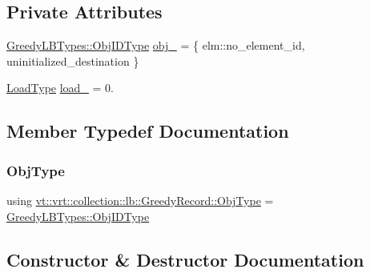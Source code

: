 \subsection*{Private Attributes}
\begin{DoxyCompactItemize}
\item 
\hyperlink{structvt_1_1vrt_1_1collection_1_1lb_1_1_greedy_l_b_types_ae22670acd689e4ff83315fac2e4acb5e}{Greedy\+L\+B\+Types\+::\+Obj\+I\+D\+Type} \hyperlink{structvt_1_1vrt_1_1collection_1_1lb_1_1_greedy_record_ab0e01d4431f547a017c9a4887bf5d207}{obj\+\_\+} = \{ elm\+::no\+\_\+element\+\_\+id, uninitialized\+\_\+destination \}
\item 
\hyperlink{namespacevt_a8fb51741340b87d7aaee0bef60e9896b}{Load\+Type} \hyperlink{structvt_1_1vrt_1_1collection_1_1lb_1_1_greedy_record_a77a97b5c704fc0e2e9b0c14125051d74}{load\+\_\+} = 0.
\end{DoxyCompactItemize}


\subsection{Member Typedef Documentation}
\mbox{\label{structvt_1_1vrt_1_1collection_1_1lb_1_1_greedy_record_a6b0754b2434fca9e865fa8422e3d709e}} 
\subsubsection{\texorpdfstring{Obj\+Type}{ObjType}}
{\footnotesize\ttfamily using \hyperlink{structvt_1_1vrt_1_1collection_1_1lb_1_1_greedy_record_a6b0754b2434fca9e865fa8422e3d709e}{vt\+::vrt\+::collection\+::lb\+::\+Greedy\+Record\+::\+Obj\+Type} =  \hyperlink{structvt_1_1vrt_1_1collection_1_1lb_1_1_greedy_l_b_types_ae22670acd689e4ff83315fac2e4acb5e}{Greedy\+L\+B\+Types\+::\+Obj\+I\+D\+Type}}



\subsection{Constructor \& Destructor Documentation}
\mbox{\label{structvt_1_1vrt_1_1collection_1_1lb_1_1_greedy_record_a150272bcbce22418638bb702093d4bf2}} 
